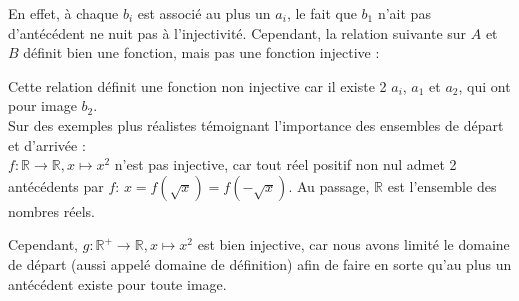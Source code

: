 \documentclass{article}
\newcommand{\R}{\mathbb{R}}
\begin{document}
\noindent En effet, à chaque $b_i$ est associé au plus un $a_i$, le fait que $b_1$ n'ait pas d'antécédent ne nuit pas à l'injectivité. Cependant, la relation suivante sur $A$ et $B$ définit bien une fonction, mais pas une fonction injective :

\begin{center}
\end{center}
Cette relation définit une fonction non injective car il existe 2 $a_i$, $a_1$ et $a_2$, qui ont pour image $b_2$.\\

\noindent Sur des exemples plus réalistes témoignant l'importance des ensembles de départ et d'arrivée :\\
$f: \R \to \R, x \mapsto x^2$ n'est pas injective, car tout réel positif non nul admet 2 antécédents par $f$: $x = f(\sqrt{x}) = f(-\sqrt{x})$. Au passage, $\R$ est l'ensemble des nombres réels.
\begin{center}
\end{center}

\noindent Cependant, $g: \R^+ \to \R, x \mapsto x^2$ est bien injective, car nous avons limité le domaine de départ (aussi appelé domaine de définition) afin de faire en sorte qu'au plus un antécédent existe pour toute image.

\begin{center}
\end{center}
\end{document}
